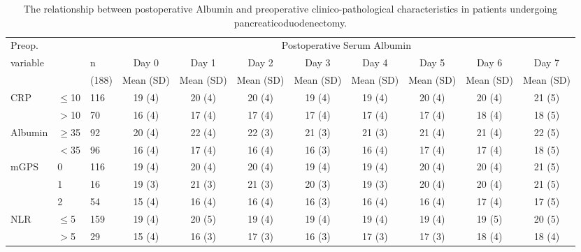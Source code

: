 \begin{sidewaystable}[p]
	\caption{The relationship  between postoperative Albumin and preoperative clinico-pathological characteristics in patients undergoing pancreaticoduodenectomy. }
	\label{table:sirs_albumin}
	\footnotesize
	\centering
	\renewcommand{\arraystretch}{1.2} %

	\begin{tabular}{|l ll | c c c c c c c c|}
		\hline
		Preop.              &           &       &                       \multicolumn{8}{c|}{Postoperative Serum Albumin}                        \\
		variable            &           & n     & Day 0     & Day 1     & Day 2     & Day 3     & Day 4     & Day 5     & Day 6     & Day 7     \\
		                    &           & (188) & Mean (SD) & Mean (SD) & Mean (SD) & Mean (SD) & Mean (SD) & Mean (SD) & Mean (SD) & Mean (SD) \\ \hline
		CRP                 & $\leq$10  & 116   & 19 (4)    & 20 (4)    & 20 (4)    & 19 (4)    & 19 (4)    & 20 (4)    & 20 (4)    & 21 (5)    \\
		                    & $>$10     & 70    & 16 (4)    & 17 (4)    & 17 (4)    & 17 (4)    & 17 (4)    & 17 (4)    & 18 (4)    & 18 (5)    \\
		Albumin             & $\geq$35  & 92    & 20 (4)    & 22 (4)    & 22 (3)    & 21 (3)    & 21 (3)    & 21 (4)    & 21 (4)    & 22 (5)    \\
		                    & $<$35     & 96    & 16 (4)    & 17 (4)    & 16 (4)    & 16 (3)    & 16 (4)    & 17 (4)    & 17 (4)    & 18 (5)    \\
		mGPS                & 0         & 116   & 19 (4)    & 20 (4)    & 20 (4)    & 19 (4)    & 19 (4)    & 20 (4)    & 20 (4)    & 21 (5)    \\
		                    & 1         & 16    & 19 (3)    & 21 (3)    & 21 (3)    & 20 (3)    & 19 (3)    & 20 (4)    & 20 (4)    & 21 (5)    \\
		                    & 2         & 54    & 15 (4)    & 16 (4)    & 16 (4)    & 16 (3)    & 16 (4)    & 16 (4)    & 17 (4)    & 17 (5)    \\
		NLR                 & $\leq$5   & 159   & 19 (4)    & 20 (5)    & 19 (4)    & 19 (4)    & 19 (4)    & 19 (4)    & 19 (5)    & 20 (5)    \\
		                    & $>$5      & 29    & 15 (4)    & 16 (3)    & 17 (3)    & 16 (3)    & 17 (3)    & 17 (3)    & 18 (4)    & 18 (4)    \\

\end{tabular}
\end{sidewaystable}

